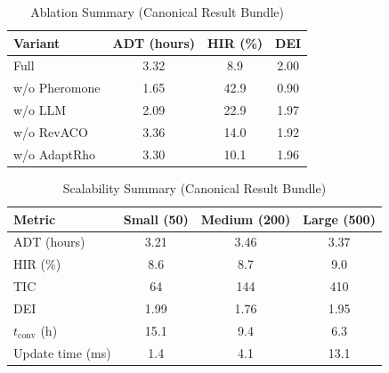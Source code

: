 \begin{table}[t]
\centering
\caption{Ablation Summary (Canonical Result Bundle)}
\small
\begin{tabular}{@{}lccc@{}}
\toprule
Variant & ADT (hours) & HIR (\%) & DEI \\
\midrule
Full & 3.32 & 8.9 & 2.00 \\
w/o Pheromone & 1.65 & 42.9 & 0.90 \\
w/o LLM & 2.09 & 22.9 & 1.97 \\
w/o RevACO & 3.36 & 14.0 & 1.92 \\
w/o AdaptRho & 3.30 & 10.1 & 1.96 \\
\bottomrule
\end{tabular}
\end{table}

\begin{table}[t]
\centering
\caption{Scalability Summary (Canonical Result Bundle)}
\small
\begin{tabular}{@{}lccc@{}}
\toprule
Metric & Small (50) & Medium (200) & Large (500) \\
\midrule
ADT (hours) & 3.21 & 3.46 & 3.37 \\
HIR (\%) & 8.6 & 8.7 & 9.0 \\
TIC & 64 & 144 & 410 \\
DEI & 1.99 & 1.76 & 1.95 \\
$t_{\mathrm{conv}}$ (h) & 15.1 & 9.4 & 6.3 \\
Update time (ms) & 1.4 & 4.1 & 13.1 \\
\bottomrule
\end{tabular}
\end{table}
